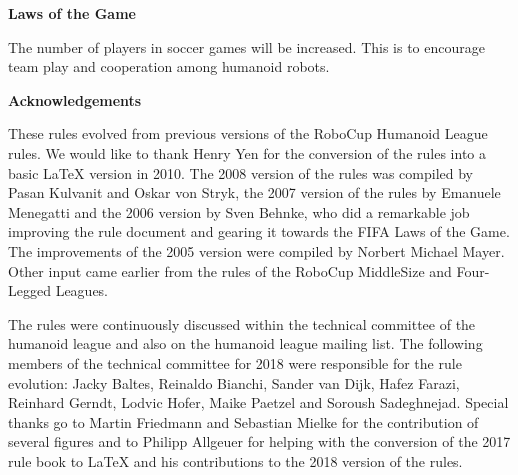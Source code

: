 {\bfseries Laws of the Game}

\headlinebox

The number of players in soccer games will be increased. This is to encourage team play and cooperation among humanoid robots.

\bigskip


\bigskip

{\bfseries Acknowledgements}

\headlinebox

These rules evolved from previous versions of the RoboCup Humanoid League rules. We would like to thank Henry Yen for the conversion of the rules into a basic LaTeX version in 2010. The 2008 version of the rules was compiled by Pasan Kulvanit and Oskar von Stryk, the 2007 version of the rules by Emanuele Menegatti and the 2006 version by Sven Behnke, who did a remarkable job improving the rule document and gearing it towards the FIFA Laws of the Game. The improvements of the 2005 version were compiled by Norbert Michael Mayer. Other input came earlier from the rules of the RoboCup MiddleSize and Four-Legged Leagues.

The rules were continuously discussed within the technical committee of the humanoid league and also on the humanoid league mailing list. The following members of the technical committee for 2018 were responsible for the rule evolution: Jacky Baltes, Reinaldo Bianchi, Sander van Dijk, Hafez Farazi, Reinhard Gerndt, Lodvic Hofer, Maike Paetzel and Soroush Sadeghnejad. Special thanks go to Martin Friedmann and Sebastian Mielke for the contribution of several figures and to Philipp Allgeuer for helping with the conversion of the 2017 rule book to LaTeX and his contributions to the 2018 version of the rules.
